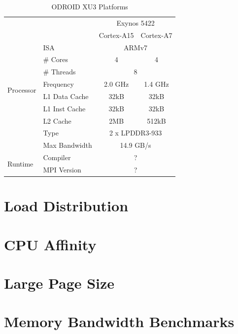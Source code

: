 \documentclass[11pt]{book}
\begin{document}
\pagebreak

\begin{table}
    \centering
    \begin{tabular}{|| l | l | c c ||}
    \hline
        \multicolumn{2}{|l|}{} & \multicolumn{2}{c||}{Exynos 5422} \\ \cline{3-4}
        \multicolumn{2}{|l|}{} & Cortex-A15 & Cortex-A7 \\ [0.5ex]
        \hline\hline
        \multirow{8}{*}{Processor}
            & ISA           & \multicolumn{2}{c||}{ARMv7} \\
            & \# Cores      & 4         & 4 \\
            & \# Threads    & \multicolumn{2}{c||}{8} \\
            & Frequency     & 2.0 GHz   & 1.4 GHz \\
            & L1 Data Cache & 32kB      & 32kB \\
            & L1 Inst Cache & 32kB      & 32kB \\
            & L2 Cache      & 2MB       & 512kB\\
        \hline
        \multirow{2}{*}{Memory}
            & Type          & \multicolumn{2}{c||}{2 x LPDDR3-933} \\
            & Max Bandwidth & \multicolumn{2}{c||}{14.9 GB/s} \\
        \hline
        \multirow{2}{*}{Runtime}
            & Compiler      & \multicolumn{2}{c||}{?} \\
            & MPI Version   & \multicolumn{2}{c||}{?} \\
        \hline
    \end{tabular}
    \caption{ODROID XU3 Platforms}\label{odroid_platform}
\end{table}

\section{Load Distribution}

\section{CPU Affinity}

\section{Large Page Size}

\section{Memory Bandwidth Benchmarks}
\end{document}
